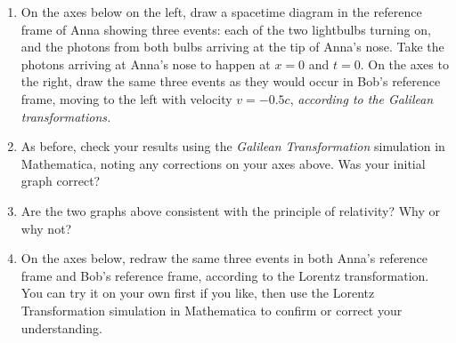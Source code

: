 \begin{enumerate}[labparts]
\item On the axes below on the left, draw a spacetime diagram in the reference frame of Anna showing three events: each of the two lightbulbs turning on, and the photons from both bulbs arriving at the tip of Anna's nose.  Take the photons arriving at Anna's nose to happen at $x=0$ and $t=0$.  On the axes to the right, draw the same three events as they would occur in Bob's reference frame, moving to the left with velocity $v=-0.5c$, \textit{according to the Galilean transformations.}

\begin{center}
\hspace{0.2in}
\begin{lab_axis}[lab_noticks_4quads,
	width=1.5in, height=1.5in,
	xlabel={$x$},
	ylabel={$t$},
	title style={at={(0.5,1)}},
	title={Anna's Frame}
	]
\end{lab_axis}
\hspace{0.3in}
\begin{lab_axis}[lab_noticks_4quads,
	width=1.5in, height=1.5in,
	xlabel={$x$},
	ylabel={$t$},
	title style={at={(0.5,1)}},
	title={Bob's Frame}
	]
\end{lab_axis}
\end{center}

\item As before, check your results using the \textit{Galilean Transformation} simulation in Mathematica, noting any corrections on your axes above.  Was your initial graph correct?
\answerspace{0.4in}

\item Are the two graphs above consistent with the principle of relativity?  Why or why not?
\answerspace{0.6in}

\pagebreak[2]
\item On the axes below, redraw the same three events in both Anna's reference frame and Bob's reference frame, according to the Lorentz transformation.  You can try it on your own first if you like, then use the Lorentz Transformation simulation in Mathematica to confirm or correct your understanding.

\begin{center}
\hspace{0.2in}
\begin{lab_axis}[lab_noticks_4quads,
	width=1.5in, height=1.5in,
	xlabel={$x$},
	ylabel={$t$},
	title style={at={(0.5,1)}},
	title={Anna's Frame}
	]
\end{lab_axis}
\hspace{0.3in}
\begin{lab_axis}[lab_noticks_4quads,
	width=1.5in, height=1.5in,
	xlabel={$x$},
	ylabel={$t$},
	title style={at={(0.5,1)}},
	title={Bob's Frame}
	]
\end{lab_axis}
\end{center}


\end{enumerate}
